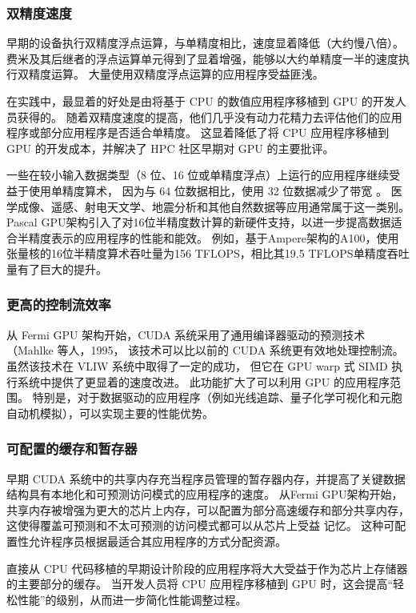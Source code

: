 \subsubsection{双精度速度}
早期的设备执行双精度浮点运算，与单精度相比，速度显着降低（大约慢八倍）。 
费米及其后继者的浮点运算单元得到了显着增强，能够以大约单精度一半的速度执行双精度运算。 
大量使用双精度浮点运算的应用程序受益匪浅。

在实践中，最显着的好处是由将基于 CPU 的数值应用程序移植到 GPU 的开发人员获得的。 
随着双精度速度的提高，他们几乎没有动力花精力去评估他们的应用程序或部分应用程序是否适合单精度。 
这显着降低了将 CPU 应用程序移植到 GPU 的开发成本，并解决了 HPC 社区早期对 GPU 的主要批评。

一些在较小输入数据类型（8 位、16 位或单精度浮点）上运行的应用程序继续受益于使用单精度算术，
因为与 64 位数据相比，使用 32 位数据减少了带宽 。 
医学成像、遥感、射电天文学、地震分析和其他自然数据等应用通常属于这一类别。 
Pascal GPU架构引入了对16位半精度数计算的新硬件支持，以进一步提高数据适合半精度表示的应用程序的性能和能效。 
例如，基于Ampere架构的A100，使用张量核的16位半精度算术吞吐量为156 TFLOPS，相比其19.5 TFLOPS单精度吞吐量有了巨大的提升。

\subsubsection{更高的控制流效率}
从 Fermi GPU 架构开始，CUDA 系统采用了通用编译器驱动的预测技术（Mahlke 等人，1995，
该技术可以比以前的 CUDA 系统更有效地处理控制流。 虽然该技术在 VLIW 系统中取得了一定的成功，
但它在 GPU warp 式 SIMD 执行系统中提供了更显着的速度改进。 
此功能扩大了可以利用 GPU 的应用程序范围。 特别是，对于数据驱动的应用程序（例如光线追踪、量子化学可视化和元胞自动机模拟），可以实现主要的性能优势。

\subsubsection{可配置的缓存和暂存器}
早期 CUDA 系统中的共享内存充当程序员管理的暂存器内存，并提高了关键数据结构具有本地化和可预测访问模式的应用程序的速度。 
从Fermi GPU架构开始，共享内存被增强为更大的芯片上内存，可以配置为部分高速缓存和部分共享内存，
这使得覆盖可预测和不太可预测的访问模式都可以从芯片上受益 记忆。 这种可配置性允许程序员根据最适合其应用程序的方式分配资源。

直接从 CPU 代码移植的早期设计阶段的应用程序将大大受益于作为芯片上存储器的主要部分的缓存。 
当开发人员将 CPU 应用程序移植到 GPU 时，这会提高“轻松性能”的级别，从而进一步简化性能调整过程。

